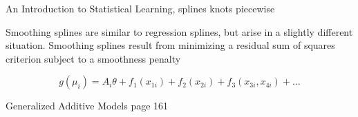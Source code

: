 An Introduction to Statistical
Learning, splines knots piecewise

Smoothing splines are similar to regression splines, but arise in a
slightly different situation. Smoothing splines result from minimizing
a residual sum of squares criterion subject to a smoothness penalty

\[
g(\mu_i) = A_i\theta + f_1(x_{1i}) + f_2(x_{2i}) + f_3(x_{3i}, x_{4i}) + \ldots
\]

Generalized Additive Models
page 161